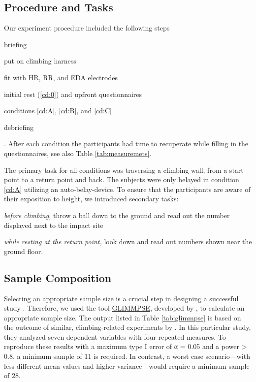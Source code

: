 \subsection{Procedure and Tasks}

Our experiment procedure included the following steps
\begin{inlinelist}
	\item briefing
	\item put on climbing harness 
	\item fit with \gls{HR}, \gls{RR}, and \gls{EDA} electrodes
	\item initial rest (\ref{cd:0}) and upfront questionnaires
	\item conditions \ref{cd:A}, \ref{cd:B}, and \ref{cd:C}
	\item debriefing
\end{inlinelist}. After each condition the participants had time to recuperate while filling in the questionnaires, see also Table \vref{tab:measuremets}.

The primary task for all conditions was traversing a climbing wall, from a start point to a return point and back. The subjects were only belayed in condition \ref{cd:A} utilizing an auto-belay-device. To ensure that the participants are aware of their exposition to height, we introduced secondary tasks:
\begin{inlinelist}
	\item \textit{before climbing,} throw a ball down to the ground and read out the number displayed next to the impact site
	\item \textit{while resting at the return point,} look down and read out numbers shown near the ground floor.
\end{inlinelist}

\subsection{Sample Composition}

Selecting an appropriate sample size is a crucial step in designing a successful study \autocite{Guo2013}. Therefore, we used the tool \href{http://glimmpse.samplesizeshop.org/}{GLIMMPSE}, developed by \citeauthor{Guo2013}, to calculate an appropriate sample size. The output listed in Table \vref{tab:glimmpse} is based on the outcome of similar, climbing-related experiments by \textcite{Hardy2007}. In this particular study, they analyzed seven dependent variables with four repeated measures. To reproduce these results with a maximum type \RN{1} error of α = 0.05 and a power > 0.8, a minimum sample of 11 is required. In contrast, a worst case scenario---with less different mean values and higher variance---would require a minimum sample of 28.

